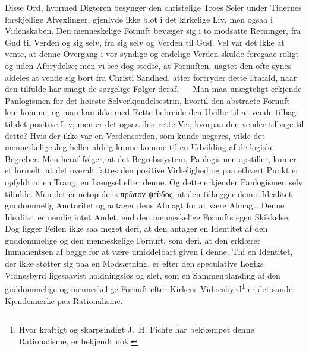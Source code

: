 \documentclass[12pt]{book}
\newcommand{\opage}[1]{\marginnote{\footnotesize\textit{[#1]}}}
\begin{document}
Disse Ord, hvormed Digteren besynger den christelige Troes Seier under Tidernes
forskjellige Afvexlinger, gjenlyde ikke blot i det kirkelige Liv, men ogsaa i
Videnskaben. Den menneskelige Fornuft bevæger sig i to modsatte Retninger, fra
Gud til Verden og sig selv, fra sig selv og Verden
\opage{144} \setcounter{footnote}{0}%
til Gud. Vel var det ikke at vente, at denne Overgang i vor syndige og endelige
Verden skulde foregaae roligt og uden Afbrydelse; men vi see dog stedse, at
Fornuften, uagtet den ofte synes aldeles at vende sig bort fra Christi Sandhed,
atter fortryder dette Frafald, naar den tilfulde har smagt de sørgelige Følger
deraf. --- Man maa unægteligt erkjende Panlogismen for det høieste
Selverkjendelsestrin, hvortil den abstracte Fornuft kan komme, og man kan ikke
med Rette bebreide den Uvillie til at vende tilbage til det positive Liv; men er
det ogsaa den rette Vei, hvorpaa den vender tilbage til dette? Hvis der ikke var
en Verdensorden, som kunde negeres, vilde det menneskelige Jeg heller aldrig
kunne komme til en Udvikling af de logiske Begreber. Men heraf følger, at det
Begrebssystem, Panlogismen opstiller, kun er et formelt, at det overalt fattes
den positive Virkelighed og paa ethvert Punkt er opfyldt af en Trang, en Længsel
efter denne. Og dette erkjender Panlogismen selv tilfulde. Men det er netop dens
πρῶτον ψεῦδος, at den tillægger denne Idealitet guddommelig Auctoritet og
antager dens Afmagt for at være Almagt. Denne Idealitet er nemlig intet Andet,
end den menneskelige Fornufts egen Skikkelse. Dog ligger Feilen ikke saa meget
deri, at den antager en Identitet af den guddommelige og den menneskelige
Fornuft, som deri, at den erklærer Immanentsen af begge for at være umiddelbart
given i denne. Thi en Identitet, der ikke støtter sig paa en Modsætning, er
efter den speculative Logiks Vidnesbyrd ligesaavist holdningsløs og slet, som en
Sammenblanding af den guddommelige og menneskelige Fornuft efter Kirkens
Vidnesbyrd\footnote{Hvor kraftigt og skarpsindigt J.~H. Fichte har bekjæmpet
denne Rationalisme, er bekjendt nok.} er det sande Kjendemærke paa Rationalisme.
\end{document}
